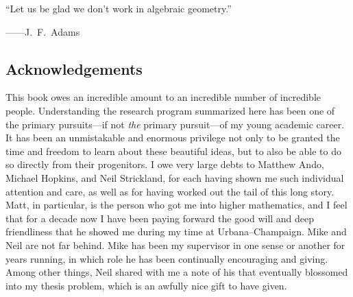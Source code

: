 
% 

\cleardoublepage

\vspace*{\fill}

\begin{center}
``Let us be glad we don't work in algebraic geometry.''

\hspace{6.3em} ------J.\ F.\ Adams~\cite[Section 2.1]{AdamsInfiniteLoopSpaces}
\end{center}

\vspace*{\fill}

\cleardoublepage

\subsection*{Acknowledgements}


This book owes an incredible amount to an incredible number of incredible people.  Understanding the research program summarized here has been one of the primary pursuits---if not \emph{the} primary pursuit---of my young academic career.  It has been an unmistakable and enormous privilege not only to be granted the time and freedom to learn about these beautiful ideas, but to also be able to do so directly from their progenitors.  I owe very large debts to Matthew Ando, Michael Hopkins, and Neil Strickland, for each having shown me such individual attention and care, as well as for having worked out the tail of this long story.  Matt, in particular, is the person who got me into higher mathematics, and I feel that for a decade now I have been paying forward the good will and deep friendliness that he showed me during my time at Urbana--Champaign.  Mike and Neil are not far behind.  Mike has been my supervisor in one sense or another for years running, in which role he has been continually encouraging and giving.  Among other things, Neil shared with me a note of his that eventually blossomed into my thesis problem, which is an awfully nice gift to have given.


